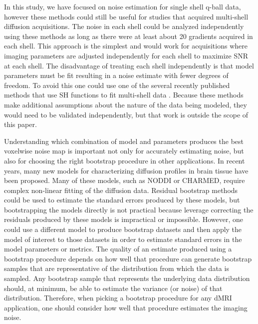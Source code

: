 In this study, we have focused on noise estimation for single shell
q-ball data, however these methods could still be useful for studies
that acquired multi-shell diffusion acquisitions. The noise in each
shell could be analyzed independently using these methods as long as
there were at least about 20 gradients acquired in each shell. This
approach is the simplest and would work for acquisitions where imaging
parameters are adjusted independently for each shell to maximize SNR at
each shell. The disadvantage of treating each shell independently is
that model parameters must be fit resulting in a noise estimate with
fewer degrees of freedom. To avoid this one could use one of the several
recently published methods that use SH functions to fit multi-shell
data \cite{Jeurissen_2014}. Because
these methods make additional assumptions about the nature of the data
being modeled, they would need to be validated independently, but that
work is outside the scope of this paper.

Understanding which combination of model and parameters produces the
best voxelwise noise map is important not only for accurately estimating
noise, but also for choosing the right bootstrap procedure in other
applications. In recent years, many new models for characterizing
diffusion profiles in brain tissue have been proposed. Many of these
models, such as NODDI\cite{Zhang_2012} or CHARMED\cite{Assaf_2005},
require complex non-linear fitting of the diffusion data. Residual
bootstrap methods could be used to estimate the standard errors produced
by these models, but bootstrapping the models directly is not practical
because leverage correcting the residuals produced by these models is
impractical or impossible. However, one could use a different model to
produce bootstrap datasets and then apply the model of interest to those
datasets in order to estimate standard errors in the model parameters or
metrics. The quality of an estimate produced using a bootstrap procedure
depends on how well that procedure can generate bootstrap samples that
are representative of the distribution from which the data is sampled.
Any bootstrap sample that represents the underlying data distribution
should, at minimum, be able to estimate the variance (or noise) of that
distribution. Therefore, when picking a bootstrap procedure for any dMRI
application, one should consider how well that procedure estimates the
imaging noise.

